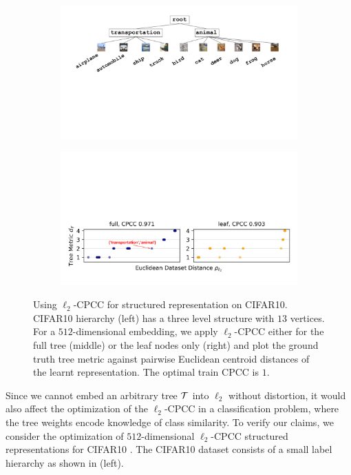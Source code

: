 \begin{figure}[t]
\vspace{-1em}
\centering
\begin{subfigure}{.5\textwidth}
  \centering
  \includegraphics[width=\linewidth]{figures/CIFAR10Tree.pdf}
\end{subfigure}%
\begin{subfigure}{.5\textwidth}
  \centering
  \includegraphics[width=\linewidth]{figures/CIFAR10CPCC.pdf}
\end{subfigure}
\caption{Using $\ell_2$-CPCC for structured representation on CIFAR10. CIFAR10 hierarchy (left) has a three level structure with $13$ vertices. For a $512$-dimensional embedding, we apply $\ell_2$-CPCC either for the full tree (middle) or the leaf nodes only (right) and plot the ground truth tree metric against pairwise Euclidean centroid distances of the learnt representation. The optimal train CPCC is $1$.}
\vspace{-1em}
\label{fig:toy}
\end{figure}

Since we cannot embed an arbitrary tree ${\mathcal{T}}$ into $\ell_2$ without distortion, it would also affect the optimization of the $\ell_2$-CPCC in a classification problem, where the tree weights encode knowledge of class similarity. To verify our claims, we consider the optimization of $512$-dimensional $\ell_2$-CPCC structured representations for CIFAR10 \citep{krizhevsky2009learning}. The CIFAR10 dataset consists of a small label hierarchy as shown in  (left). 

